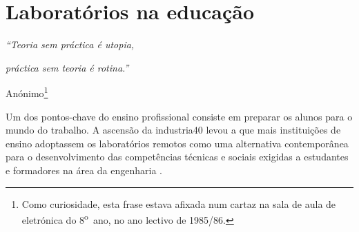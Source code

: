 
\section{Laboratórios na educação}
\label{Laboratóriosnaeducação}

\begin{center}
    \textit{``Teoria sem práctica é utopia,}

    \textit{práctica sem teoria é rotina.''}

    Anónimo\footnote{Como curiosidade, esta frase estava afixada num cartaz na sala de aula de eletrónica do 8\textsuperscript{o}~ano, no ano lectivo de 1985/86.}

\end{center}
Um dos pontos-chave do ensino profissional consiste em preparar os alunos para o mundo do trabalho. A ascensão da \gls{industria40} levou a que mais instituições de ensino adoptassem os laboratórios remotos como uma alternativa contemporânea para o desenvolvimento das competências técnicas e sociais exigidas a estudantes e formadores na área da engenharia \cite{EvaluationRemoteVirtualE-Learning}.

